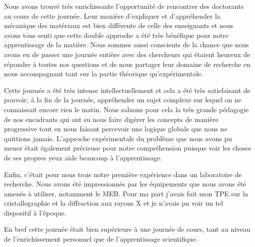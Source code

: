 Nous avons trouvé très enrichissante l'opportunité de rencontrer des doctorants au cours de cette journée.
Leur manière d'expliquer et d'appréhender la mécanique des matériaux est bien différente de celle des 
enseignants et nous avons tous senti que cette double approche a été très bénéfique pour notre apprentissage 
de la matière. Nous sommes aussi conscients de la chance que nous avons eu de passer une journée entière avec 
des chercheurs qui étaient heureux de répondre à toutes nos questions et de nous partager leur domaine de 
recherche en nous accompagnant tant sur la partie théorique qu'expérimentale. 

Cette journée a été très intense intellectuellement et cela a été très satisfaisant de pouvoir, à la fin de 
la journée, appréhender un sujet complexe sur lequel on ne connaissait encore rien le matin. Nous saluons 
pour cela la très grande pédagogie de nos encadrants qui ont su nous faire digérer les concepts de manière 
progressive tout en nous faisant percevoir une logique globale que nous ne quittions jamais. L'approche 
expérimentale du problème que nous avons pu mener était également précieuse pour notre compréhension puisque 
voir les choses de ses propres yeux aide beaucoup à l'apprentissage.

Enfin, c'était pour nous trois notre première expérience dans un laboratoire de recherche. Nous avons été 
impressionnés par les équipements que nous avons été amenés à utiliser, notamment le MEB. Pour ma part 
j'avais fait mon TPE sur la cristallographie et la diffraction aux rayons X et je n'avais pu voir un tel 
dispositif à l'époque.

En bref cette journée était bien supérieure à une journée de cours, tant au niveau de l'enrichissement 
personnel que de l'apprentissage scientifique.